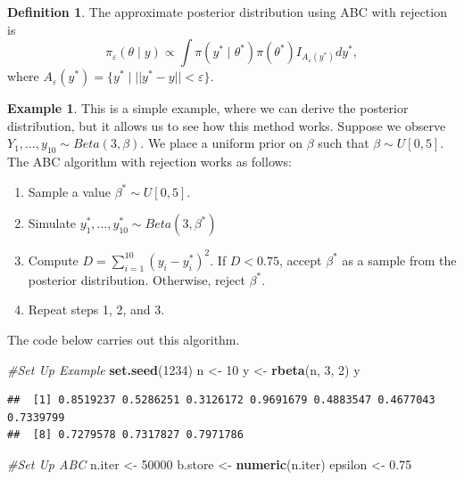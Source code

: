 \documentclass[
]{book}
\newenvironment{Shaded}{\begin{snugshade}}{\end{snugshade}}
\newcommand{\CommentTok}[1]{\textcolor[rgb]{0.56,0.35,0.01}{\textit{#1}}}
\newcommand{\DecValTok}[1]{\textcolor[rgb]{0.00,0.00,0.81}{#1}}
\newcommand{\FloatTok}[1]{\textcolor[rgb]{0.00,0.00,0.81}{#1}}
\newcommand{\FunctionTok}[1]{\textcolor[rgb]{0.13,0.29,0.53}{\textbf{#1}}}
\newcommand{\NormalTok}[1]{#1}
\newcommand{\OtherTok}[1]{\textcolor[rgb]{0.56,0.35,0.01}{#1}}
\providecommand{\tightlist}{%
  \setlength{\itemsep}{0pt}\setlength{\parskip}{0pt}}
\theoremstyle{definition}
\newtheorem{definition}{Definition}[chapter]
\theoremstyle{definition}
\newtheorem{example}{Example}[chapter]
\theoremstyle{definition}
\theoremstyle{definition}
\theoremstyle{remark}
\begin{document}
\begin{definition}
The approximate posterior distribution using ABC with rejection is
\[
\pi_\varepsilon(\theta \mid y) \propto \int \pi(y^* \mid \theta^*)\pi(\theta^*)I_{A_\varepsilon(y^*)} dy^*,
\]
where \({A_\varepsilon(y^*)} = \{y^* \mid ||y^* - y||< \varepsilon\}\).
\end{definition}

\begin{example}

This is a simple example, where we can derive the posterior distribution, but it allows us to see how this method works. Suppose we observe \(Y_1, \ldots, y_{10}\sim Beta(3, \beta)\). We place a uniform prior on \(\beta\) such that \(\beta \sim U[0, 5]\). The ABC algorithm with rejection works as follows:

\begin{enumerate}
\def\labelenumi{\arabic{enumi}.}
\tightlist
\item
  Sample a value \(\beta^* \sim U[0, 5]\).
\item
  Simulate \(y^*_1, \ldots, y^*_{10} \sim Beta(3,\beta^*)\)
\item
  Compute \(D = \sum_{i=1}^{10}(y_i -y^*_i)^2\). If \(D < 0.75\), accept \(\beta^*\) as a sample from the posterior distribution. Otherwise, reject \(\beta^*\).
\item
  Repeat steps 1, 2, and 3.
\end{enumerate}

The code below carries out this algorithm.

\begin{Shaded}
\begin{Highlighting}[]
\CommentTok{\#Set Up Example}
\FunctionTok{set.seed}\NormalTok{(}\DecValTok{1234}\NormalTok{)}
\NormalTok{n }\OtherTok{\textless{}{-}} \DecValTok{10}
\NormalTok{y }\OtherTok{\textless{}{-}} \FunctionTok{rbeta}\NormalTok{(n, }\DecValTok{3}\NormalTok{, }\DecValTok{2}\NormalTok{)}
\NormalTok{y}
\end{Highlighting}
\end{Shaded}

\begin{verbatim}
##  [1] 0.8519237 0.5286251 0.3126172 0.9691679 0.4883547 0.4677043 0.7339799
##  [8] 0.7279578 0.7317827 0.7971786
\end{verbatim}

\begin{Shaded}
\begin{Highlighting}[]
\CommentTok{\#Set Up ABC}
\NormalTok{n.iter }\OtherTok{\textless{}{-}} \DecValTok{50000}
\NormalTok{b.store }\OtherTok{\textless{}{-}} \FunctionTok{numeric}\NormalTok{(n.iter)}
\NormalTok{epsilon }\OtherTok{\textless{}{-}} \FloatTok{0.75}


\end{Highlighting}
\end{Shaded}
\end{example}
\end{document}
